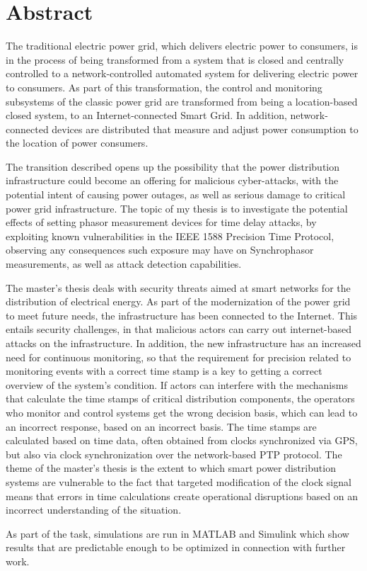 \chapter*{Abstract}

The traditional electric power grid, which delivers electric power to consumers, is in the process of being transformed from a system that is closed and centrally controlled to a network-controlled automated system for delivering electric power to consumers.
As part of this transformation, the control and monitoring subsystems of the classic power grid are transformed from being a location-based closed system, to an Internet-connected Smart Grid. In addition, network-connected devices are distributed that measure and adjust power consumption to the location of power consumers.

The transition described opens up the possibility that the power distribution infrastructure could become an offering for malicious cyber-attacks, with the potential intent of causing power outages, as well as serious damage to critical power grid infrastructure. The topic of my thesis is to investigate the potential effects of setting phasor measurement devices for time delay attacks, by exploiting known vulnerabilities in the IEEE 1588 Precision Time Protocol, observing any consequences such exposure may have on Synchrophasor measurements, as well as attack detection capabilities.

The master's thesis deals with security threats aimed at smart networks for the distribution of electrical energy. As part of the modernization of the power grid to meet future needs, the infrastructure has been connected to the Internet. This entails security challenges, in that malicious actors can carry out internet-based attacks on the infrastructure. In addition, the new infrastructure has an increased need for continuous monitoring, so that the requirement for precision related to monitoring events with a correct time stamp is a key to getting a correct overview of the system's condition. If actors can interfere with the mechanisms that calculate the time stamps of critical distribution components, the operators who monitor and control systems get the wrong decision basis, which can lead to an incorrect response, based on an incorrect basis. The time stamps are calculated based on time data, often obtained from clocks synchronized via GPS, but also via clock synchronization over the network-based PTP protocol. The theme of the master's thesis is the extent to which smart power distribution systems are vulnerable to the fact that targeted modification of the clock signal means that errors in time calculations create operational disruptions based on an incorrect understanding of the situation.

As part of the task, simulations are run in MATLAB and Simulink which show results that are predictable enough to be optimized in connection with further work.